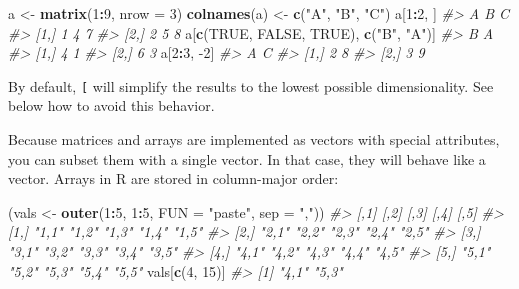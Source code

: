 \documentclass[]{book}
\newenvironment{Shaded}{\begin{snugshade}}{\end{snugshade}}
\newcommand{\CommentTok}[1]{\textcolor[rgb]{0.56,0.35,0.01}{\textit{#1}}}
\newcommand{\DataTypeTok}[1]{\textcolor[rgb]{0.13,0.29,0.53}{#1}}
\newcommand{\DecValTok}[1]{\textcolor[rgb]{0.00,0.00,0.81}{#1}}
\newcommand{\KeywordTok}[1]{\textcolor[rgb]{0.13,0.29,0.53}{\textbf{#1}}}
\newcommand{\NormalTok}[1]{#1}
\newcommand{\OperatorTok}[1]{\textcolor[rgb]{0.81,0.36,0.00}{\textbf{#1}}}
\newcommand{\OtherTok}[1]{\textcolor[rgb]{0.56,0.35,0.01}{#1}}
\newcommand{\StringTok}[1]{\textcolor[rgb]{0.31,0.60,0.02}{#1}}
\theoremstyle{definition}
\theoremstyle{definition}
\theoremstyle{definition}
\theoremstyle{remark}
\begin{document}
\begin{Shaded}
\begin{Highlighting}[]
\NormalTok{a <-}\StringTok{ }\KeywordTok{matrix}\NormalTok{(}\DecValTok{1}\OperatorTok{:}\DecValTok{9}\NormalTok{, }\DataTypeTok{nrow =} \DecValTok{3}\NormalTok{)}
\KeywordTok{colnames}\NormalTok{(a) <-}\StringTok{ }\KeywordTok{c}\NormalTok{(}\StringTok{"A"}\NormalTok{, }\StringTok{"B"}\NormalTok{, }\StringTok{"C"}\NormalTok{)}
\NormalTok{a[}\DecValTok{1}\OperatorTok{:}\DecValTok{2}\NormalTok{, ]}
\CommentTok{#>      A B C}
\CommentTok{#> [1,] 1 4 7}
\CommentTok{#> [2,] 2 5 8}
\NormalTok{a[}\KeywordTok{c}\NormalTok{(}\OtherTok{TRUE}\NormalTok{, }\OtherTok{FALSE}\NormalTok{, }\OtherTok{TRUE}\NormalTok{), }\KeywordTok{c}\NormalTok{(}\StringTok{"B"}\NormalTok{, }\StringTok{"A"}\NormalTok{)]}
\CommentTok{#>      B A}
\CommentTok{#> [1,] 4 1}
\CommentTok{#> [2,] 6 3}
\NormalTok{a[}\DecValTok{2}\OperatorTok{:}\DecValTok{3}\NormalTok{, }\DecValTok{-2}\NormalTok{]}
\CommentTok{#>      A C}
\CommentTok{#> [1,] 2 8}
\CommentTok{#> [2,] 3 9}
\end{Highlighting}
\end{Shaded}

By default, \texttt{{[}} will simplify the results to the lowest
possible dimensionality. See below how to avoid this behavior.

Because matrices and arrays are implemented as vectors with special
attributes, you can subset them with a single vector. In that case, they
will behave like a vector. Arrays in R are stored in column-major order:

\begin{Shaded}
\begin{Highlighting}[]
\NormalTok{(vals <-}\StringTok{ }\KeywordTok{outer}\NormalTok{(}\DecValTok{1}\OperatorTok{:}\DecValTok{5}\NormalTok{, }\DecValTok{1}\OperatorTok{:}\DecValTok{5}\NormalTok{, }\DataTypeTok{FUN =} \StringTok{"paste"}\NormalTok{, }\DataTypeTok{sep =} \StringTok{","}\NormalTok{))}
\CommentTok{#>      [,1]  [,2]  [,3]  [,4]  [,5] }
\CommentTok{#> [1,] "1,1" "1,2" "1,3" "1,4" "1,5"}
\CommentTok{#> [2,] "2,1" "2,2" "2,3" "2,4" "2,5"}
\CommentTok{#> [3,] "3,1" "3,2" "3,3" "3,4" "3,5"}
\CommentTok{#> [4,] "4,1" "4,2" "4,3" "4,4" "4,5"}
\CommentTok{#> [5,] "5,1" "5,2" "5,3" "5,4" "5,5"}
\NormalTok{vals[}\KeywordTok{c}\NormalTok{(}\DecValTok{4}\NormalTok{, }\DecValTok{15}\NormalTok{)]}
\CommentTok{#> [1] "4,1" "5,3"}
\end{Highlighting}
\end{Shaded}
\end{document}
